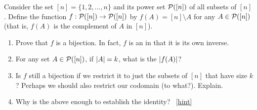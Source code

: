 \documentclass{book}
\begin{document}
\setcounter{project}{75}
\addtocounter{project}{-1}
\begin{activity}[]\label{act-pascalsym-bij}
\hypertarget{p-598}{}%
Consider the set \([n] = \{1,2,\ldots,n\}\) and its power set \(\mathcal P([n])\) of all subsets of \([n]\).  Define the function \(f:\mathcal P([n]) \to \mathcal P([n])\) by \(f(A) = [n]\setminus A\) for any \(A \in \mathcal P([n])\) (that is, \(f(A)\) is the complement of \(A\) in \([n]\)).%
\begin{enumerate}[font=\bfseries,label=(\alph*),ref=\alph*]
\item\label{task-108} \hypertarget{p-599}{}%
Prove that \(f\) is a bijection.  In fact, \(f\) is an  in that it is its own inverse.%
\item\label{task-109} \hypertarget{p-600}{}%
For any set \(A \in \mathcal P([n])\), if \(\left| A \right| = k\), what is the \(\left| f(A) \right|\)?%
\item\label{task-110} \hypertarget{p-601}{}%
Is \(f\) still a bijection if we restrict it to just the subsets of \([n]\) that have size \(k\)?  Perhaps we should also restrict our codomain (to what?).  Explain.%
\item\label{task-111} \hypertarget{p-602}{}%
Why is the above enough to establish the identity?%
~\hfill{\tiny\hyperlink{a-75.d}{[hint]}\hypertarget{q-75.d}{}}\end{enumerate}
\end{activity}
\end{document}
